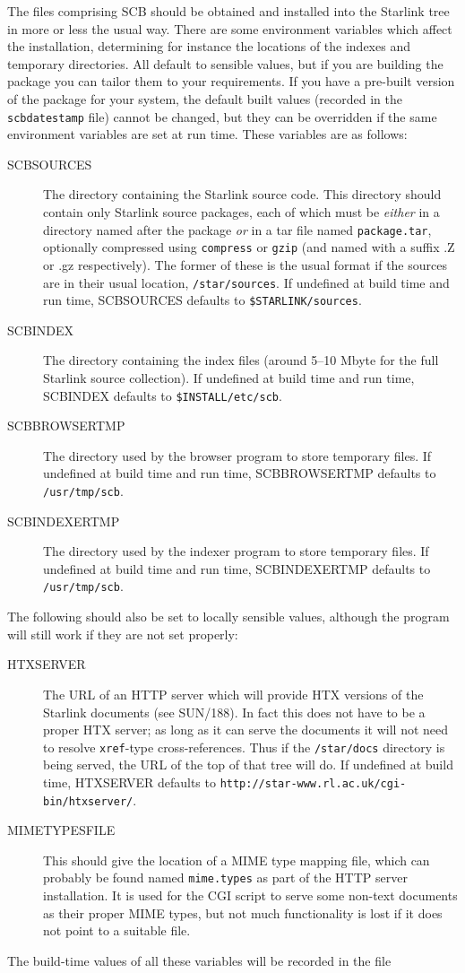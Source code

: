 \documentclass[twoside,11pt]{article}
\newcommand{\xref}[3]{#1}
\renewcommand{\_}{\texttt{\symbol{95}}}
\begin{document}
The files comprising SCB should be obtained and installed into
the Starlink tree in more or less the usual way.
There are some environment variables which affect the
installation, determining for instance the locations of the 
indexes and temporary directories.  
All default to sensible values, but if you are building the package
you can tailor them to your requirements.
If you have a pre-built version of the package for your system,
the default built values 
(recorded in the {\tt scb\_datestamp} file)
cannot be changed, but they can 
be overridden if the same environment variables are set at run time.
These variables are as follows:
\begin{description}
\item[SCB\_SOURCES]
The directory containing the Starlink source code.  
This directory should contain only Starlink source packages,
each of which must be {\em either\/} in a directory named after the package
{\em or\/} in a tar file named {\tt package.tar}, optionally compressed
using {\tt compress} or {\tt gzip} (and named with a suffix .Z or .gz 
respectively).
The former of these is the usual format if the sources are in
their usual location, {\tt /star/sources}.
If undefined at build time and run time, SCB\_SOURCES 
defaults to {\tt \$STARLINK/sources}.
\item[SCB\_INDEX]
The directory containing the index files (around 5--10 Mbyte for the full
Starlink source collection).
If undefined at build time and run time, SCB\_INDEX defaults to
{\tt \$INSTALL/etc/scb}.
\item[SCB\_BROWSER\_TMP]
The directory used by the browser program to store temporary files. 
If undefined at build time and run time, SCB\_BROWSER\_TMP defaults to
{\tt /usr/tmp/scb}.
\item[SCB\_INDEXER\_TMP]
The directory used by the indexer program to store temporary files. 
If undefined at build time and run time, SCB\_INDEXER\_TMP defaults to
{\tt /usr/tmp/scb}.
\end{description}
The following should also be set to locally sensible values,
although the program will still work if they are not set properly:
\begin{description}
\item[HTX\_SERVER]
The URL of an HTTP server which will provide HTX versions of the Starlink
documents (see \xref{SUN/188}{sun188}{remote_document_servers}).
In fact this does not have to be a proper HTX server; as long as it
can serve the documents it will not need to resolve {\tt xref\_}-type 
cross-references.
Thus if the {\tt /star/docs} directory is being served, the URL of
the top of that tree will do.
If undefined at build time, HTX\_SERVER defaults to 
{\tt http://star-www.rl.ac.uk/cgi-bin/htxserver/}.
\item[MIMETYPES\_FILE]
This should give the location of a MIME type mapping file,
which can probably be found named {\tt mime.types}
as part of the HTTP server installation.
It is used for the CGI script
to serve some non-text documents as their proper MIME types,
but not much functionality is lost if it does not point to a suitable file.
\end{description}
The build-time values of all these variables will be recorded
in the file 
\end{document}
